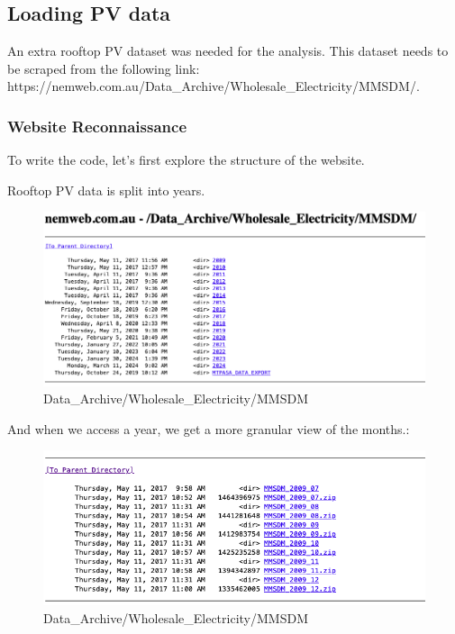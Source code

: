 \documentclass[
]{article}
\begin{document}
\subsection{Loading PV data}\label{loading-pv-data}

An extra rooftop PV dataset was needed for the analysis. This dataset
needs to be scraped from the following link:
https://nemweb.com.au/Data\_Archive/Wholesale\_Electricity/MMSDM/.

\subsubsection{Website Reconnaissance}\label{website-reconnaissance}

To write the code, let's first explore the structure of the website.

Rooftop PV data is split into years.

\begin{figure}
\centering
\includegraphics{img/nemweb-1.png}
\caption{Data\_Archive/Wholesale\_Electricity/MMSDM}
\end{figure}

And when we access a year, we get a more granular view of the months.:

\begin{figure}
\centering
\includegraphics{img/nemweb-2.png}
\caption{Data\_Archive/Wholesale\_Electricity/MMSDM}
\end{figure}
\end{document}
